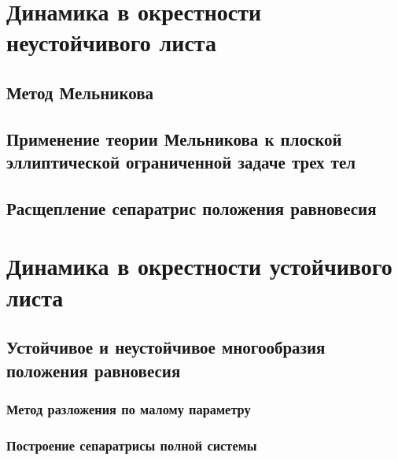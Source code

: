 \documentclass[a4paper, 12pt]{article}
\begin{document}
        
    \section{Динамика в окрестности неустойчивого листа}

        \subsection{Метод Мельникова}
        

        \subsection{Применение теории Мельникова к плоской эллиптической ограниченной задаче трех тел}
        

        \subsection{Расщепление сепаратрис положения равновесия}
        

    

    \section{Динамика в окрестности устойчивого листа}
        
        
        \subsection{Устойчивое и неустойчивое многообразия положения равновесия}
        
            \subsubsection{Метод разложения по малому параметру}
            

            \subsubsection{Построение сепаратрисы полной системы}
            
\end{document}
